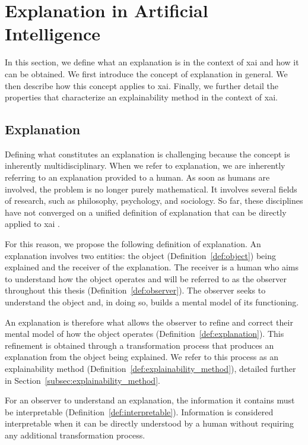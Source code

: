 \section{Explanation in Artificial Intelligence}
\label{sec:explainability_in_reinforcement_learning_explanation_in_artificial_intelligence}

In this section, we define what an explanation is in the context of \gls{xai} and how it can be obtained.
We first introduce the concept of explanation in general.
We then describe how this concept applies to \gls{xai}.
Finally, we further detail the properties that characterize an explainability method in the context of \gls{xai}.

\subsection{Explanation}
\label{subsec:explanation}
Defining what constitutes an explanation is challenging because the concept is inherently multidisciplinary.
When we refer to explanation, we are inherently referring to an explanation provided to a human.
As soon as humans are involved, the problem is no longer purely mathematical.
It involves several fields of research, such as philosophy, psychology, and sociology.
So far, these disciplines have not converged on a unified definition of explanation that can be directly applied to \gls{xai} \parencite{miller2019explanation, bellucci2021towards}.

For this reason, we propose the following definition of explanation.
An explanation involves two entities: the object (Definition~\ref{def:object}) being explained and the receiver of the explanation.
The receiver is a human who aims to understand how the object operates and will be referred to as the observer throughout this thesis (Definition~\ref{def:observer}).
The observer seeks to understand the object and, in doing so, builds a mental model of its functioning.

An explanation is therefore what allows the observer to refine and correct their mental model of how the object operates (Definition~\ref{def:explanation}).
This refinement is obtained through a transformation process that produces an explanation from the object being explained.
We refer to this process as an explainability method (Definition~\ref{def:explainability_method}), detailed further in Section~\ref{subsec:explainability_method}.

For an observer to understand an explanation, the information it contains must be interpretable (Definition~\ref{def:interpretable}).
Information is considered interpretable when it can be directly understood by a human without requiring any additional transformation process.

